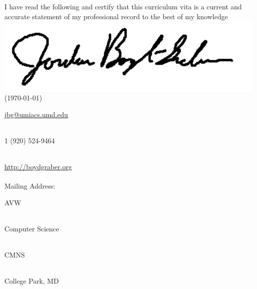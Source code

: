 

\ifumd
\usepackage{graphicx}
\fi

\newcommand{\umdtext}[2]{
\ifumd
#1 #2
\else
#2
\fi
}








\ifumd
\vspace{.2cm}
  \parbox{\linewidth}{I have read the following and certify that this
  curriculum vita is a current and accurate statement of my
  professional record to the best of my
  knowledge \flushright  \includegraphics[width=.2\linewidth]{resume_src/signature} \\
\flushright  (\today{})}
\vspace{.5cm}
\fi

\ifumd


\fi

\noindent\href{mailto:jbg@umiacs.umd.edu}{jbg@umiacs.umd.edu}
\umdtext{\\}{\bull} %
\textsmaller{+}1 (920) 524-9464
\umdtext{\\}{\bull} \href{http://boydgraber.org}{\url{http://boydgraber.org}}\\ %
\umdtext{\\Mailing Address: \\ \bull}{} 3155 AVW
\umdtext{\\ }{\bull} Computer Science
\umdtext{\\ }{\bull} CMNS
\umdtext{\\ }{\bull} College Park, MD

\ifumd
\else
\spacedhrule{0.9em}{-0.4em} %
\fi

